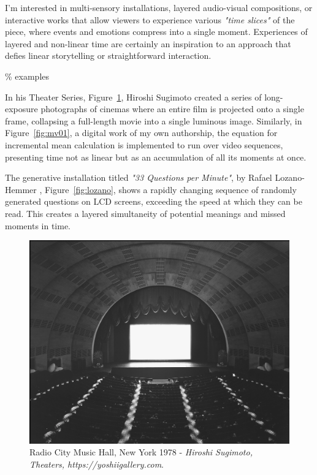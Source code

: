 I'm interested in multi-sensory installations, layered audio-visual compositions, or interactive works that allow viewers to experience various \textit{"time slices"} of the piece, where events and emotions compress into a single moment. Experiences of layered and non-linear time are certainly an inspiration to an approach that defies linear storytelling or straightforward interaction.

{\scriptsize \textcolor{comment}{\% examples}}

In his Theater Series, Figure~\ref{fig:sugimoto}, Hiroshi Sugimoto \citep{sugimotohiroshi} created a series of long-exposure photographs of cinemas where an entire film is projected onto a single frame, collapsing a full-length movie into a single luminous image. Similarly, in Figure~\ref{fig:mv01}, a digital work of my own authorship, the equation for incremental mean calculation is implemented to run over video sequences, presenting time not as linear but as an accumulation of all its moments at once.

The generative installation titled \textit{"33 Questions per Minute"}, by Rafael Lozano-Hemmer \citep{lozano-hemmer}, Figure~\ref{fig:lozano}, shows a rapidly changing sequence of randomly generated questions on LCD screens, exceeding the speed at which they can be read. This creates a layered simultaneity of potential meanings and missed moments in time.

\begin{figure}
    \centering
    \includegraphics[width=0.8\linewidth]{assets/hiroshi-sugimoto-theaters-1978-1993-Radio-City-Music-Hall-1.png} 
    \caption{\small  Radio City Music Hall, New York 1978 - \textit{Hiroshi Sugimoto, Theaters, https://yoshiigallery.com}.}
    \label{fig:sugimoto}
\end{figure}



